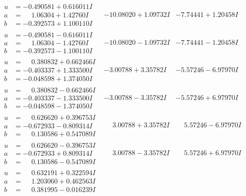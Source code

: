 \documentclass[1p]{elsarticle_modified}
\theoremstyle{definition}
\begin{document}
$$\begin{array}{c|c|c}
\begin{aligned}
u &= -0.490581 + 0.616011 I \\
a &= \phantom{-}1.06304 + 1.42760 I \\
b &= -0.392573 + 1.100110 I\end{aligned}
 & -10.08020 + 1.09732 I & -7.74441 + 1.20458 I \\ \hline\begin{aligned}
u &= -0.490581 - 0.616011 I \\
a &= \phantom{-}1.06304 - 1.42760 I \\
b &= -0.392573 - 1.100110 I\end{aligned}
 & -10.08020 - 1.09732 I & -7.74441 - 1.20458 I \\ \hline\begin{aligned}
u &= \phantom{-}0.380832 + 0.662466 I \\
a &= -0.403337 + 1.333500 I \\
b &= -0.048598 + 1.374050 I\end{aligned}
 & -3.00788 + 3.35782 I & -5.57246 - 6.97970 I \\ \hline\begin{aligned}
u &= \phantom{-}0.380832 - 0.662466 I \\
a &= -0.403337 - 1.333500 I \\
b &= -0.048598 - 1.374050 I\end{aligned}
 & -3.00788 - 3.35782 I & -5.57246 + 6.97970 I \\ \hline\begin{aligned}
u &= \phantom{-}0.626620 + 0.396753 I \\
a &= -0.672933 - 0.809314 I \\
b &= \phantom{-}0.130586 + 0.547089 I\end{aligned}
 & \phantom{-}3.00788 + 3.35782 I & \phantom{-}5.57246 - 6.97970 I \\ \hline\begin{aligned}
u &= \phantom{-}0.626620 - 0.396753 I \\
a &= -0.672933 + 0.809314 I \\
b &= \phantom{-}0.130586 - 0.547089 I\end{aligned}
 & \phantom{-}3.00788 - 3.35782 I & \phantom{-}5.57246 + 6.97970 I \\ \hline\begin{aligned}
u &= \phantom{-}0.632191 + 0.322594 I \\
a &= \phantom{-}1.203060 + 0.462563 I \\
b &= \phantom{-}0.381995 - 0.016239 I\end{aligned}

\end{array}$$
\end{document}
